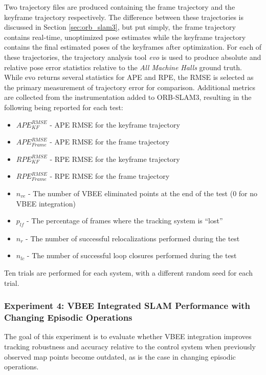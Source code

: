 Two trajectory files are produced containing the frame trajectory and the keyframe trajectory respectively. The difference between these trajectories is discussed in Section \ref{sec:orb_slam3}, but put simply, the frame trajectory contains real-time, unoptimized pose estimates while the keyframe trajectory contains the final estimated poses of the keyframes after optimization. For each of these trajectories, the trajectory analysis tool \textit{evo} is used to produce absolute and relative pose error statistics relative to the \textit{All Machine Halls} ground truth. While evo returns several statistics for APE and RPE, the RMSE is selected as the primary measurement of trajectory error for comparison. Additional metrics are collected from the instrumentation added to ORB-SLAM3, resulting in the following being reported for each test:
\begin{itemize}
    \item $APE^{RMSE}_{KF}$ - APE RMSE for the keyframe trajectory
    \item $APE^{RMSE}_{Frame}$ - APE RMSE for the frame trajectory
    \item $RPE^{RMSE}_{KF}$ - RPE RMSE for the keyframe trajectory
    \item $RPE^{RMSE}_{Frame}$ - RPE RMSE for the frame trajectory
    \item $n_{ve}$ - The number of VBEE eliminated points at the end of the test (0 for no VBEE integration)
    \item $p_{lf}$ - The percentage of frames where the tracking system is ``lost''
    \item $n_{r}$ - The number of successful relocalizations performed during the test
    \item $n_{lc}$ - The number of successful loop closures performed during the test
\end{itemize}

Ten trials are performed for each system, with a different random seed for each trial.

\subsubsection*{Experiment 4: VBEE Integrated SLAM Performance with Changing Episodic Operations}
The goal of this experiment is to evaluate whether VBEE integration improves tracking robustness and accuracy relative to the control system when previously observed map points become outdated, as is the case in changing episodic operations.

